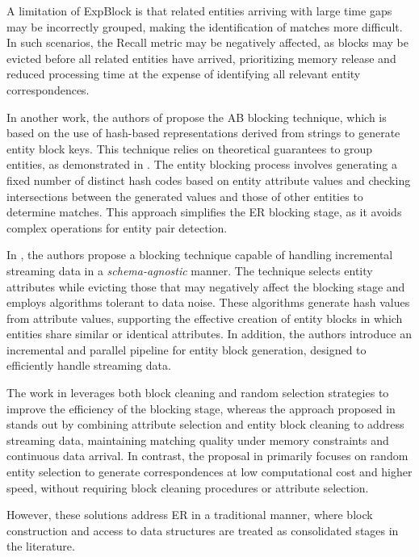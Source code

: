 \documentclass{ieeeaccess}
\begin{document}
A limitation of ExpBlock \cite{karapiperis2023} is that related entities arriving with large time gaps may be incorrectly grouped, making the identification of matches more difficult. In such scenarios, the Recall metric may be negatively affected, as blocks may be evicted before all related entities have arrived, prioritizing memory release and reduced processing time at the expense of identifying all relevant entity correspondences.

In another work, the authors of \cite{10.1109/TKDE.2024.3361022} propose the AB blocking technique, which is based on the use of hash-based representations derived from strings to generate entity block keys. This technique relies on theoretical guarantees to group entities, as demonstrated in \cite{lshbased01}. The entity blocking process involves generating a fixed number of distinct hash codes based on entity attribute values and checking intersections between the generated values and those of other entities to determine matches. This approach simplifies the ER blocking stage, as it avoids complex operations for entity pair detection.

In \cite{info13120568}, the authors propose a blocking technique capable of handling incremental streaming data in a \textit{schema-agnostic} manner. The technique selects entity attributes while evicting those that may negatively affect the blocking stage and employs algorithms tolerant to data noise. These algorithms generate hash values from attribute values, supporting the effective creation of entity blocks in which entities share similar or identical attributes. In addition, the authors introduce an incremental and parallel pipeline for entity block generation, designed to efficiently handle streaming data.

The work in \cite{karapiperis2023} leverages both block cleaning and random selection strategies to improve the efficiency of the blocking stage, whereas the approach proposed in \cite{info13120568} stands out by combining attribute selection and entity block cleaning to address streaming data, maintaining matching quality under memory constraints and continuous data arrival. In contrast, the proposal in \cite{10.1109/TKDE.2024.3361022} primarily focuses on random entity selection to generate correspondences at low computational cost and higher speed, without requiring block cleaning procedures or attribute selection.

However, these solutions \cite{10.1109/TKDE.2024.3361022, karapiperis2023, info13120568, lshbased01, Gazzarri2021, 10.1145/3341105.3375776, DBLP:conf/edbt/KarapiperisGV18, Karapiperis2018SummarizationAF, 10.14778/2556549.2556567, DBLP:conf/edbt/GazzarriH23, 8403302, DONASCIMENTO2018335, 10.1145/3448016.3457238, 9378127, 10.14778/2732939.2732943} address ER in a traditional manner, where block construction and access to data structures are treated as consolidated stages in the literature.
\end{document}
